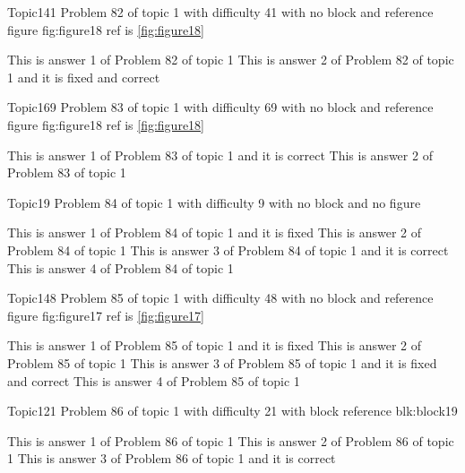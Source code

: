 \documentclass[master]{exam}
\begin{document}
\begin{problem}{Topic1}{41}
	Problem 82 of topic 1 with difficulty 41 with no block and reference figure fig:figure18 ref is \ref{fig:figure18}
	\begin{answers}
		\answer This is answer 1 of Problem 82 of topic 1 
		 This is answer 2 of Problem 82 of topic 1 and it is fixed and correct
	\end{answers}
\end{problem}

\begin{problem}{Topic1}{69}
	Problem 83 of topic 1 with difficulty 69 with no block and reference figure fig:figure18 ref is \ref{fig:figure18}
	\begin{answers}
		\answer[correct] This is answer 1 of Problem 83 of topic 1 and it is correct
		\answer This is answer 2 of Problem 83 of topic 1 
	\end{answers}
\end{problem}

\begin{problem}{Topic1}{9}
	Problem 84 of topic 1 with difficulty 9 with no block and no figure
	\begin{answers}
		\answer[fixed] This is answer 1 of Problem 84 of topic 1 and it is fixed
		\answer This is answer 2 of Problem 84 of topic 1 
		\answer[correct] This is answer 3 of Problem 84 of topic 1 and it is correct
		\answer This is answer 4 of Problem 84 of topic 1 
	\end{answers}
\end{problem}

\begin{problem}{Topic1}{48}
	Problem 85 of topic 1 with difficulty 48 with no block and reference figure fig:figure17 ref is \ref{fig:figure17}
	\begin{answers}
		\answer[fixed] This is answer 1 of Problem 85 of topic 1 and it is fixed
		\answer This is answer 2 of Problem 85 of topic 1 
		 This is answer 3 of Problem 85 of topic 1 and it is fixed and correct
		\answer This is answer 4 of Problem 85 of topic 1 
	\end{answers}
\end{problem}

\begin{problem}[requires=blk:block19]{Topic1}{21}
	Problem 86 of topic 1 with difficulty 21 with block reference blk:block19
	\begin{answers}
		\answer This is answer 1 of Problem 86 of topic 1 
		\answer This is answer 2 of Problem 86 of topic 1 
		\answer[correct] This is answer 3 of Problem 86 of topic 1 and it is correct
	\end{answers}
\end{problem}
\end{document}
